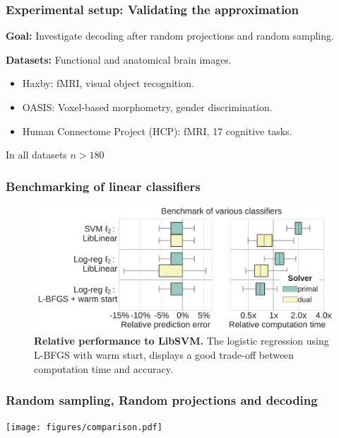 \documentclass{beamer}
\begin{document}
\begin{frame}\frametitle{\textbf{Experimental setup:} Validating the 
approximation}

\begin{block}{}
\textbf{Goal:} Investigate decoding after random projections and random 
sampling. 

\textbf{Datasets:} Functional and anatomical brain images.

\begin{itemize}
\item Haxby: fMRI, visual object recognition.
\item OASIS: Voxel-based morphometry, gender discrimination.
\item Human Connectome Project (HCP): fMRI, 17 cognitive tasks. 
\end{itemize}

In all datasets $n > 180$
\end{block}
\end{frame}


\begin{frame}\frametitle{Benchmarking of linear classifiers}
\begin{figure}
\centering
\includegraphics[width=1\linewidth]{figures/benchmark.pdf}
\caption{\textbf{Relative performance to LibSVM.} The logistic regression using 
L-BFGS with warm start, displays a good trade-off between computation time and 
accuracy.}
\end{figure}
\end{frame}


\begin{frame}\frametitle{Random sampling, Random projections and decoding}
\texttt{[image: figures/comparison.pdf]}
\end{frame}
\end{document}
